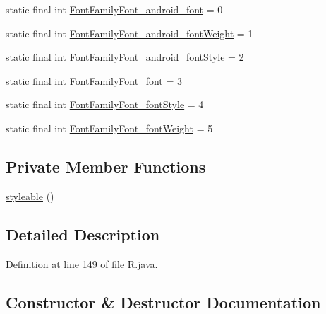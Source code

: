 \begin{DoxyCompactItemize}
\item 
static final int \mbox{\hyperlink{classandroid_1_1support_1_1transition_1_1_r_1_1styleable_ab28b00d13d25557869606a725bacc669}{Font\+Family\+Font\+\_\+android\+\_\+font}} = 0
\item 
static final int \mbox{\hyperlink{classandroid_1_1support_1_1transition_1_1_r_1_1styleable_aec0a024320619dd5367897334e5b6307}{Font\+Family\+Font\+\_\+android\+\_\+font\+Weight}} = 1
\item 
static final int \mbox{\hyperlink{classandroid_1_1support_1_1transition_1_1_r_1_1styleable_a0743a4a69c55f8bebf9d33e4d826f58e}{Font\+Family\+Font\+\_\+android\+\_\+font\+Style}} = 2
\item 
static final int \mbox{\hyperlink{classandroid_1_1support_1_1transition_1_1_r_1_1styleable_a406a736a8de29f76c14e9b08daeac820}{Font\+Family\+Font\+\_\+font}} = 3
\item 
static final int \mbox{\hyperlink{classandroid_1_1support_1_1transition_1_1_r_1_1styleable_aa596a29b204cadfcf4894041bb877a46}{Font\+Family\+Font\+\_\+font\+Style}} = 4
\item 
static final int \mbox{\hyperlink{classandroid_1_1support_1_1transition_1_1_r_1_1styleable_ac169fcd6c0a602cbbc9306606e16ab9a}{Font\+Family\+Font\+\_\+font\+Weight}} = 5
\end{DoxyCompactItemize}
\subsection*{Private Member Functions}
\begin{DoxyCompactItemize}
\item 
\mbox{\hyperlink{classandroid_1_1support_1_1transition_1_1_r_1_1styleable_abe7de307fb4eb3d946d21bce152edc1f}{styleable}} ()
\end{DoxyCompactItemize}


\subsection{Detailed Description}


Definition at line 149 of file R.\+java.



\subsection{Constructor \& Destructor Documentation}
\mbox{\label{classandroid_1_1support_1_1transition_1_1_r_1_1styleable_abe7de307fb4eb3d946d21bce152edc1f}} 
